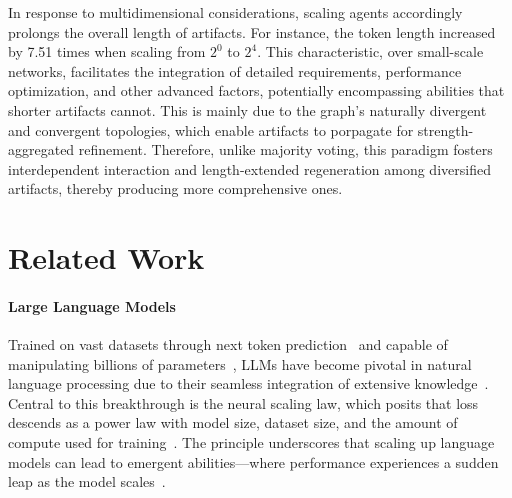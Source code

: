 \documentclass{article}
\begin{document}
In response to multidimensional considerations, scaling agents accordingly prolongs the overall length of artifacts. For instance, the token length increased by 7.51 times when scaling from \(2^0\) to \(2^4\). 
This characteristic, over small-scale networks, facilitates the integration of detailed requirements, performance optimization, and other advanced factors, potentially encompassing abilities that shorter artifacts cannot. This is mainly due to the graph's naturally divergent and convergent topologies, which enable artifacts to porpagate for strength-aggregated refinement. Therefore, unlike majority voting, this paradigm fosters interdependent interaction and length-extended regeneration among diversified artifacts, thereby producing more comprehensive ones.


\section{Related Work}
\paragraph{Large Language Models}
Trained on vast datasets through next token prediction~\citep{vaswani2017attention} and capable of manipulating billions of parameters~\citep{Muennighoff2024Scaling}, LLMs have become pivotal in natural language processing due to their seamless integration of extensive knowledge~\citep{NEURIPS2020_1457c0d6,bubeck2023sparks,radford2019language,touvron2023llama,wei2022emergent,Shanahan2023,chen2021evaluating,brants2007large,chen2021evaluating,ouyang2022training,yang2023large,qin2023large}.
Central to this breakthrough is the neural scaling law, which posits that loss descends as a power law with model size, dataset size, and the amount of compute used for training~\citep{kaplan2020scaling,Smith2022Using,Ruan2024Observational}. 
The principle underscores that scaling up language models can lead to emergent abilities—where performance experiences a sudden leap as the model scales~\citep{wei2022emergent,Schaeffer2024Are}.
\end{document}
